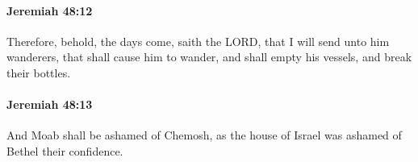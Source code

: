 		\paragraph{Jeremiah 48:12} %
			\label{JEREMIAH-48-12}

			Therefore, behold, the days come, saith the LORD, that I will send unto him wanderers, that shall cause him to wander, and shall empty his vessels, and break their bottles.


		\paragraph{Jeremiah 48:13} %
			\label{JEREMIAH-48-13}

			And Moab shall be ashamed of Chemosh, as the house of Israel was ashamed of Bethel their confidence.



